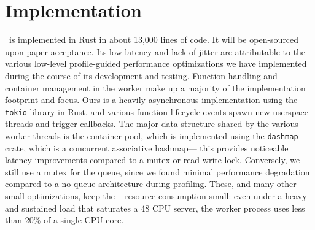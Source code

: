 \section{Implementation}
\label{sec:impl}


\sysname~is implemented in Rust in about 13,000 lines of code.
It will be open-sourced upon paper acceptance. 
Its low latency and lack of jitter are attributable to the various low-level profile-guided performance optimizations we have implemented during the course of its development and testing.
Function handling and container management in the worker make up a majority of the implementation footprint and focus. 
Ours is a heavily asynchronous implementation using the \texttt{tokio} library in Rust, and various function lifecycle events spawn new userspace threads and trigger callbacks. 
The major data structure shared by the various worker threads is the container pool, which is implemented using the \texttt{dashmap} crate, which is a concurrent associative hashmap--- this provides noticeable latency improvements compared to a mutex or read-write lock.
Conversely, we still use a mutex for the queue, since we found minimal performance degradation compared to a no-queue architecture during profiling. 
These, and many other small optimizations, keep the \sysname~
resource consumption small: even under a heavy and sustained load that saturates a 48 CPU server, the worker process uses less than 20\% of a single CPU core. 








